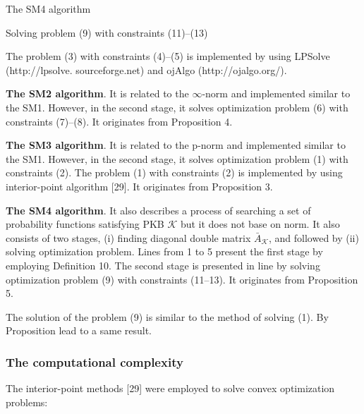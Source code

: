 \documentclass[10pt,a4paper]{IOS-Book-Article}
\begin{document}
\begin{algorithm}
\caption{The SM4 algorithm}
\begin{algorithmic}[1]

	\Else 
	\EndIf
\EndFor
\EndFor
\State Solving problem (9) with constraints (11)–(13)
\State {}
\end{algorithmic}
\end{algorithm}

The problem (3) with constraints (4)–(5) is implemented by using LPSolve (http://lpsolve. sourceforge.net) and ojAlgo (http://ojalgo.org/).

\textbf{The SM2 algorithm}. It is related to the $\infty$-norm and implemented similar to the SM1. However, in the second stage, it solves optimization problem (6) with constraints (7)–(8). It originates from Proposition 4.

\textbf{The SM3 algorithm}. It is related to the p-norm and implemented similar to the SM1. However, in the second stage, it solves optimization problem (1) with constraints (2). The problem (1) with constraints (2) is implemented by using interior-point algorithm [29]. It originates from Proposition 3.

\textbf{The SM4 algorithm}. It also describes a process of searching a set of probability functions satisfying PKB $\mathcal{K}$ but it does not base on norm. It also consists of two stages, (i) finding diagonal double matrix $\bar{A}_\mathcal{K}$, and followed by (ii) solving optimization problem. Lines from 1 to 5 present the first stage by employing Definition 10. The second stage is presented in line by solving optimization problem (9) with constraints (11–13). It originates from Proposition 5.

The solution of the problem (9) is similar to the method of solving (1). By Proposition lead to a same result.

\subsubsection{The computational complexity}
The interior-point methods [29] were employed to
solve convex optimization problems:
\end{document}
